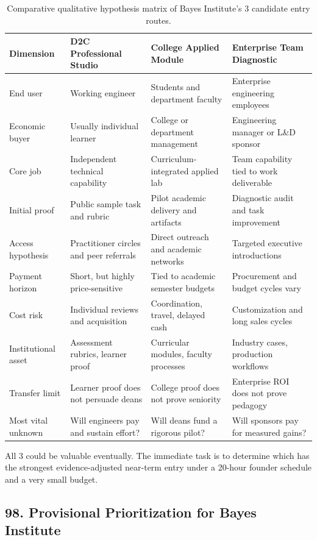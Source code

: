 \begin{table}[t]
\centering
\small
\begin{tabularx}{\textwidth}{l p{4.6cm} p{4.6cm} X}
\toprule
\textbf{Dimension} & \textbf{D2C Professional Studio} & \textbf{College Applied Module} & \textbf{Enterprise Team Diagnostic} \\
\midrule
End user & Working engineer & Students and department faculty & Enterprise engineering employees \\
Economic buyer & Usually individual learner & College or department management & Engineering manager or L\&D sponsor \\
Core job & Independent technical capability & Curriculum-integrated applied lab & Team capability tied to work deliverable \\
Initial proof & Public sample task and rubric & Pilot academic delivery and artifacts & Diagnostic audit and task improvement \\
Access hypothesis & Practitioner circles and peer referrals & Direct outreach and academic networks & Targeted executive introductions \\
Payment horizon & Short, but highly price-sensitive & Tied to academic semester budgets & Procurement and budget cycles vary \\
Cost risk & Individual reviews and acquisition & Coordination, travel, delayed cash & Customization and long sales cycles \\
Institutional asset & Assessment rubrics, learner proof & Curricular modules, faculty processes & Industry cases, production workflows \\
Transfer limit & Learner proof does not persuade deans & College proof does not prove seniority & Enterprise ROI does not prove pedagogy \\
Most vital unknown & Will engineers pay and sustain effort? & Will deans fund a rigorous pilot? & Will sponsors pay for measured gains? \\
\bottomrule
\end{tabularx}
\caption{Comparative qualitative hypothesis matrix of Bayes Institute's 3 candidate entry routes.}
\label{tab:ch7-bayes-routes-matrix}
\end{table}

All 3 could be valuable eventually. The immediate task is to determine which has the strongest evidence-adjusted near-term entry under a 20-hour founder schedule and a very small budget.

\subsection*{98. Provisional Prioritization for Bayes Institute}


